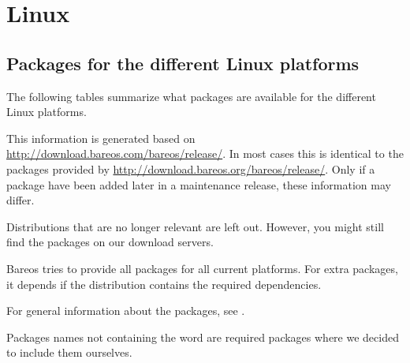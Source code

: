 % 

\section{Linux}

\subsection{Packages for the different Linux platforms}
\label{sec:packages}

The following tables summarize what packages are available for the different Linux platforms.

This information is generated based on \url{http://download.bareos.com/bareos/release/}.
In most cases this is identical to the packages provided by \url{http://download.bareos.org/bareos/release/}.
Only if a package have been added later in a maintenance release, these information may differ.

Distributions that are no longer relevant are left out.
However, you might still find the packages on our download servers.

Bareos tries to provide all packages for all current platforms.
For extra packages, it depends if the distribution contains the required dependencies.

For general information about the packages, see .

Packages names not containing the word  are required packages where we decided to include them ourselves.

{
    \small
    
    
    
    
    
    
}






